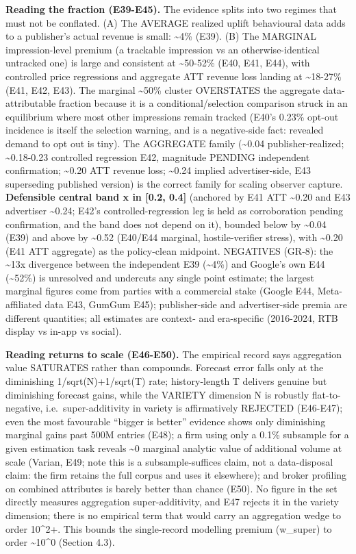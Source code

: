 \documentclass[
  11pt,
]{article}
\begin{document}
\textbf{Reading the fraction (E39-E45).} The evidence splits into two
regimes that must not be conflated. (A) The AVERAGE realized uplift
behavioural data adds to a publisher's actual revenue is small:
\textasciitilde4\% (E39). (B) The MARGINAL impression-level premium (a
trackable impression vs an otherwise-identical untracked one) is large
and consistent at \textasciitilde50-52\% (E40, E41, E44), with
controlled price regressions and aggregate ATT revenue loss landing at
\textasciitilde18-27\% (E41, E42, E43). The marginal \textasciitilde50\%
cluster OVERSTATES the aggregate data-attributable fraction because it
is a conditional/selection comparison struck in an equilibrium where
most other impressions remain tracked (E40's 0.23\% opt-out incidence is
itself the selection warning, and is a negative-side fact: revealed
demand to opt out is tiny). The AGGREGATE family (\textasciitilde0.04
publisher-realized; \textasciitilde0.18-0.23 controlled regression E42,
magnitude PENDING independent confirmation; \textasciitilde0.20 ATT
revenue loss; \textasciitilde0.24 implied advertiser-side, E43
superseding published version) is the correct family for scaling
observer capture. \textbf{Defensible central band x in {[}0.2, 0.4{]}}
(anchored by E41 ATT \textasciitilde0.20 and E43 advertiser
\textasciitilde0.24; E42's controlled-regression leg is held as
corroboration pending confirmation, and the band does not depend on it),
bounded below by \textasciitilde0.04 (E39) and above by
\textasciitilde0.52 (E40/E44 marginal, hostile-verifier stress), with
\textasciitilde0.20 (E41 ATT aggregate) as the policy-clean midpoint.
NEGATIVES (GR-8): the \textasciitilde13x divergence between the
independent E39 (\textasciitilde4\%) and Google's own E44
(\textasciitilde52\%) is unresolved and undercuts any single point
estimate; the largest marginal figures come from parties with a
commercial stake (Google E44, Meta-affiliated data E43, GumGum E45);
publisher-side and advertiser-side premia are different quantities; all
estimates are context- and era-specific (2016-2024, RTB display vs
in-app vs social).

\textbf{Reading returns to scale (E46-E50).} The empirical record says
aggregation value SATURATES rather than compounds. Forecast error falls
only at the diminishing 1/sqrt(N)+1/sqrt(T) rate; history-length T
delivers genuine but diminishing forecast gains, while the VARIETY
dimension N is robustly flat-to-negative, i.e.~super-additivity in
variety is affirmatively REJECTED (E46-E47); even the most favourable
``bigger is better'' evidence shows only diminishing marginal gains past
500M entries (E48); a firm using only a 0.1\% subsample for a given
estimation task reveals \textasciitilde0 marginal analytic value of
additional volume at scale (Varian, E49; note this is a
subsample-suffices claim, not a data-disposal claim: the firm retains
the full corpus and uses it elsewhere); and broker profiling on combined
attributes is barely better than chance (E50). No figure in the set
directly measures aggregation super-additivity, and E47 rejects it in
the variety dimension; there is no empirical term that would carry an
aggregation wedge to order 10\^{}2+. This bounds the single-record
modelling premium (w\_super) to order \textasciitilde10\^{}0 (Section
4.3).
\end{document}

